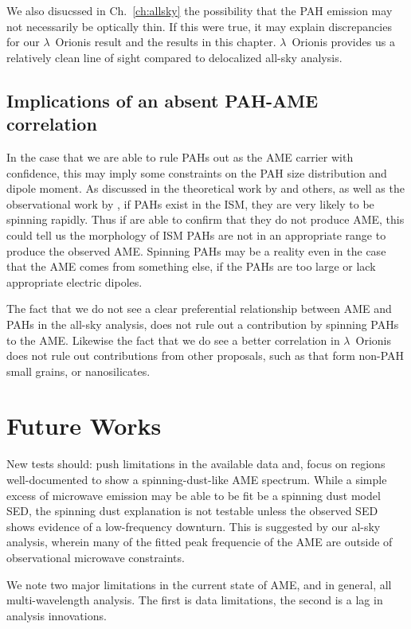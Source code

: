               We also disucssed in Ch.~\ref{ch:allsky} the possibility that the PAH emission may not necessarily be optically thin. If this were true, it may explain discrepancies for our $\lambda$~Orionis result and the results in this chapter. $\lambda$~Orionis provides us a relatively clean line of sight compared to delocalized all-sky analysis.

              \subsection{Implications of an absent PAH-AME correlation}
              In the case that we are able to rule PAHs out as the AME carrier with confidence, this may imply some constraints on the PAH size distribution and dipole moment. As discussed in the theoretical work by \cite{draine98a, ali-haimoud10} and others, as well as the observational work by \cite{hensley16}, if PAHs exist in the ISM, they are very likely to be spinning rapidly. Thus if are able to confirm that they do not produce AME, this could tell us the morphology of ISM PAHs are not in an appropriate range to produce the observed AME. Spinning PAHs may be a reality even in the case that the AME comes from something else, if the PAHs are too large or lack appropriate electric dipoles.

            The fact that we do not see a clear preferential relationship between AME and PAHs in the all-sky analysis, does not rule out a contribution by spinning PAHs to the AME. Likewise the fact that we do see a better correlation in $\lambda$~Orionis does not rule out contributions from other proposals, such as that form non-PAH small grains, or nanosilicates.


              \section{Future Works}
                New tests should: push limitations in the available data and, focus on regions well-documented to show a spinning-dust-like AME spectrum. While a simple excess of microwave emission may be able to be fit be a spinning dust model SED, the spinning dust explanation is not testable unless the observed SED shows evidence of a low-frequency downturn. This is suggested by our al-sky analysis, wherein many of the fitted peak frequencie of the AME are outside of observational microwave constraints.

                We note two major limitations in the current state of AME, and in general, all multi-wavelength analysis.
                The first is data limitations, the second is a lag in analysis innovations.

